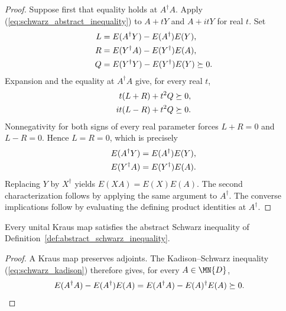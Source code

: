 \begin{proof}
    \leanok
    Suppose first that equality holds at $A^\dagger A$. Apply
    (\ref{eq:schwarz_abstract_inequality}) to $A+tY$ and $A+itY$ for real
    $t$. Set
    \begin{align}
        L & =E(A^\dagger Y)-E(A^\dagger)E(Y), \notag  \\
        R & =E(Y^\dagger A)-E(Y^\dagger)E(A), \notag  \\
        Q & =E(Y^\dagger Y)-E(Y^\dagger)E(Y)\succeq0.
        \notag
    \end{align}
    Expansion and the equality at $A^\dagger A$ give, for every real $t$,
    \begin{align}
        t(L+R)+t^2Q  & \succeq0, \notag \\
        it(L-R)+t^2Q & \succeq0.
        \notag
    \end{align}
    Nonnegativity for both signs of every real parameter forces $L+R=0$ and
    $L-R=0$. Hence $L=R=0$, which is precisely
    \begin{align}
        E(A^\dagger Y) & =E(A^\dagger)E(Y), \notag \\
        E(Y^\dagger A) & =E(Y^\dagger)E(A).
        \notag
    \end{align}
    Replacing $Y$ by $X^\dagger$ yields $E(XA)=E(X)E(A)$.
    The second characterization follows by applying the same argument to
    $A^\dagger$. The converse implications follow by evaluating the defining
    product identities at $A^\dagger$.
\end{proof}

\begin{theorem}
    \label{thm:kraus_abstract_schwarz}
    \leanok
    Every unital Kraus map satisfies the abstract Schwarz inequality of
    Definition~\ref{def:abstract_schwarz_inequality}.
\end{theorem}

\begin{proof}
    \leanok
    A Kraus map preserves adjoints. The Kadison--Schwarz inequality
    (\ref{eq:schwarz_kadison}) therefore gives, for every $A\in\MN{D}$,
    \begin{align}
        E(A^\dagger A)-E(A^\dagger)E(A)
         & =E(A^\dagger A)-E(A)^\dagger E(A)\succeq0.
        \notag
    \end{align}
\end{proof}

